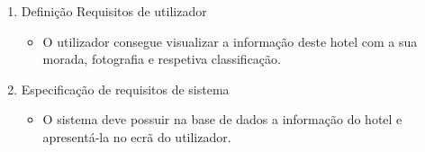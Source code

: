 \begin{enumerate}
    \item Definição Requisitos de utilizador
    \begin{itemize}
        \item O utilizador consegue visualizar a informação deste hotel com a sua morada, fotografia e respetiva classificação.
    \end{itemize}
    \item Especificação de requisitos de sistema
    \begin{itemize}
        \item O sistema deve possuir na base de dados a informação do hotel e apresentá-la no ecrã do utilizador.
    \end{itemize}
\end{enumerate}